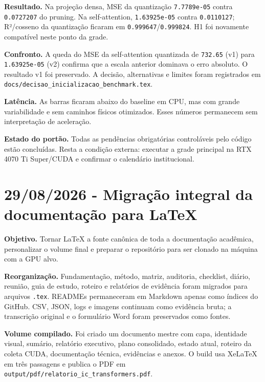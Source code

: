 \textbf{Resultado.} Na projeção densa, MSE da quantização \texttt{7.\allowbreak{}7789e-05} contra \texttt{0.\allowbreak{}0727207} do pruning. Na self-attention, \texttt{1.\allowbreak{}63925e-05} contra \texttt{0.\allowbreak{}0110127}; R²/cosseno da quantização ficaram em \texttt{0.\allowbreak{}999647}/\texttt{0.\allowbreak{}999824}. H1 foi novamente compatível neste ponto da grade.






\textbf{Confronto.} A queda do MSE da self-attention quantizada de \texttt{732.\allowbreak{}65} (v1) para \texttt{1.\allowbreak{}63925e-05} (v2) confirma que a escala anterior dominava o erro absoluto. O resultado v1 foi preservado. A decisão, alternativas e limites foram registrados em \texttt{docs/\allowbreak{}decisao\_\allowbreak{}inicializacao\_\allowbreak{}benchmark.\allowbreak{}tex}.





\textbf{Latência.} As barras ficaram abaixo do baseline em CPU, mas com grande variabilidade e sem caminhos físicos otimizados. Esses números permanecem sem interpretação de aceleração.





\textbf{Estado do portão.} Todas as pendências obrigatórias controláveis pelo código estão concluídas. Resta a condição externa: executar a grade principal na RTX 4070 Ti Super/CUDA e confirmar o calendário institucional.

\section{29/08/2026 - Migração integral da documentação para LaTeX}

\textbf{Objetivo.} Tornar LaTeX a fonte canônica de toda a documentação
acadêmica, personalizar o volume final e preparar o repositório para ser clonado
na máquina com a GPU alvo.

\textbf{Reorganização.} Fundamentação, método, matriz, auditoria, checklist,
diário, reunião, guia de estudo, roteiro e relatórios de evidência foram migrados
para arquivos \texttt{.tex}. READMEs permaneceram em Markdown apenas como
índices do GitHub. CSV, JSON, logs e imagens continuam como evidência bruta; a
transcrição original e o formulário Word foram preservados como fontes.

\textbf{Volume compilado.} Foi criado um documento mestre com capa, identidade
visual, sumário, relatório executivo, plano consolidado, estado atual, roteiro
da coleta CUDA, documentação técnica, evidências e anexos. O build usa XeLaTeX
em três passagens e publica o PDF em
\texttt{output/pdf/relatorio\_\allowbreak{}ic\_\allowbreak{}transformers.pdf}.

